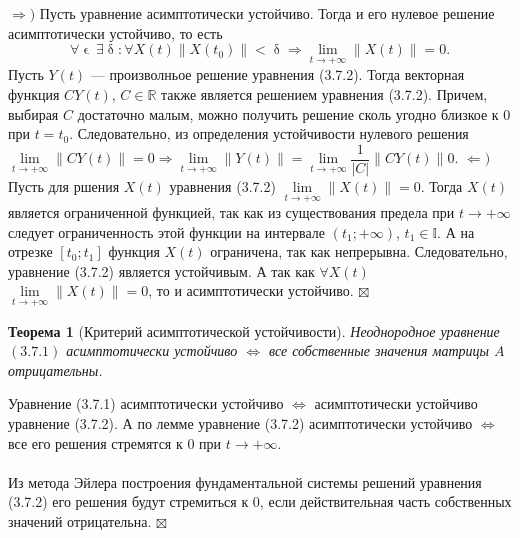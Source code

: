 \documentclass[a4paper, 12pt]{report}
\newenvironment{Proof} %
{\par\noindent{$\blacklozenge$}} %
{\hfill$\scriptstyle\boxtimes$}
\newcommand{\Rm}{\mathbb{R}}
\newcommand{\I}{\mathbb{I}}
\renewcommand{\delta}{\updelta}
\renewcommand{\epsilon}{\upvarepsilon}
\newcommand\Norm[1]{\left\| #1 \right\|}
\newtheorem*{theorem}{Теорема}
\begin{document}
\begin{Proof}
	$\Rightarrow)$ Пусть уравнение асимптотически устойчиво. Тогда и его нулевое решение асимптотически устойчиво, то есть $$\forall \epsilon\ \exists \delta : \forall X(t) \Norm{X(t_0)} < \delta \Rightarrow \lim\limits_{t\to +\infty} \Norm{X(t)} = 0.$$
	Пусть $Y(t)$ --- произволньое решение уравнения (3.7.2). Тогда векторная функция $CY(t)$, $C \in \Rm$ также является решением уравнения (3.7.2). Причем, выбирая $C$ достаточно малым, можно получить решение сколь угодно близкое к 0 при $t = t_0$. Следовательно, из определения устойчивости нулевого решения $\lim\limits_{t\to +\infty} \Norm{CY(t)} = 0 \Rightarrow \lim\limits_{t\to +\infty} \Norm{Y(t)} = \lim\limits_{t\to +\infty} \dfrac{1}{|C|}\Norm{CY(t)} 0 $.
	$\Leftarrow)$ Пусть для ршения $X(t)$ уравнения (3.7.2) $\lim\limits_{t\to +\infty} \Norm{X(t)} = 0$. Тогда $X(t)$ является ограниченной функцией, так как из существования предела при $t\to +\infty$ следует ограниченность этой функции на интервале $(t_1; +\infty)$, $t_1 \in \I$. А на отрезке $[t_0; t_1]$ функция $X(t)$ ограничена, так как непрерывна. Следовательно, уравнение (3.7.2) является устойчивым. А так как $\forall X(t)$ $\lim\limits_{t\to +\infty} \Norm{X(t)} = 0$, то и асимптотически устойчиво.
\end{Proof}
\begin{theorem}
	[Критерий асимптотической устойчивости]
	Неоднородное уравнение $(3.7.1)$ асимптотически устойчиво $\Longleftrightarrow$ все собственные значения матрицы $A$ отрицательны.
\end{theorem}
\begin{Proof}
	Уравнение (3.7.1) асимптотически устойчиво $\Longleftrightarrow$ асимптотически устойчиво уравнение (3.7.2). А по лемме уравнение (3.7.2) асимптотически устойчиво $\Longleftrightarrow$ все его решения стремятся к 0 при $t\to+\infty$.\\\\
	Из метода Эйлера построения фундаментальной системы решений уравнения (3.7.2) его решения будут стремиться к 0, если действительная часть собственных значений отрицательна.
\end{Proof}
\end{document}
